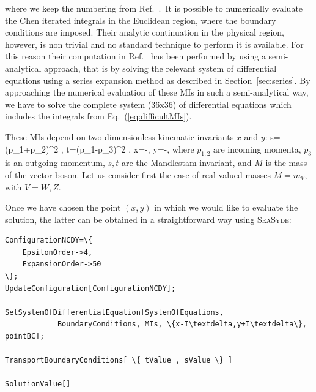\documentclass[final,1p,times]{elsarticle}
\begin{document}
where we keep the numbering from Ref.~\cite{Armadillo:2022bgm}.\
It is possible to numerically evaluate the Chen iterated integrals in the Euclidean region, where the boundary conditions are imposed.
Their analytic continuation in the physical region, however, is non trivial and no standard technique to perform it is available. For this reason their computation in Ref.~\cite{Armadillo:2022bgm} has been performed by using a semi-analytical approach, that is by solving the relevant system of differential equations using a series expansion method as described in Section~\ref{sec:series}. 
By approaching the numerical evaluation of these MIs in such a semi-analytical way, we have to solve the complete system (36x36) of differential equations which includes the integrals from Eq.~(\ref{eq:difficultMIs}).

These MIs depend on two dimensionless kinematic invariants
$x$ and $y$:
\be
    s=(p_1+p_2)^2 \;,\qquad
    t=(p_1-p_3)^2 \;,\qquad
    x=-\;,\qquad
    y=-\;,
    \label{eq:kinVariablesReal}
\ee
where $p_{1,2}$ are incoming momenta, $p_3$ is an outgoing momentum, $s,t$ are the Mandlestam invariant, and
$M$ is the mass of the vector boson.
Let us consider first the case of real-valued masses $M=m_V$, with $V=W,Z$.

Once we have chosen the point $(x,y)$
in which we would like to evaluate the solution, the latter can be obtained in a straightforward way
using \textsc{SeaSyde}:
\begin{Verbatim}[commandchars=\\\{\}] 
ConfigurationNCDY=\{                               
	EpsilonOrder->4,                               
	ExpansionOrder->50                                 
\};                                                      
UpdateConfiguration[ConfigurationNCDY];

SetSystemOfDifferentialEquation[SystemOfEquations, 
	        BoundaryConditions, MIs, \{x-I\textdelta,y+I\textdelta\}, pointBC]; 

TransportBoundaryConditions[ \{ tValue , sValue \} ]

SolutionValue[]
\end{Verbatim}
\end{document}
